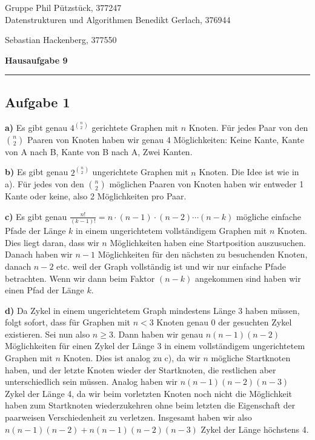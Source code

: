 \documentclass[a4paper,graphics,11pt]{article}
\newcommand{\aufgabe}[1]{\subsection*{Aufgabe #1}}
\begin{document}
\noindent Gruppe              \hfill Phil Pützstück, 377247\\
\noindent Datenstrukturen und Algorithmen \hfill Benedikt Gerlach, 376944\\
\strut\hfill Sebastian Hackenberg, 377550\\
\begin{center}
	\LARGE{\textbf{Hausaufgabe 9}}
\end{center}
\begin{center}
\rule[0.1ex]{\textwidth}{1pt}
\end{center}

\aufgabe{1}
\textbf{a)}
Es gibt genau $4^{\binom{n}{2}}$ gerichtete Graphen mit $n$ Knoten. Für jedes Paar von den $\binom{n}{2}$ Paaren
von Knoten haben wir genau 4 Möglichkeiten: Keine Kante, Kante von A nach B, Kante von B nach A, Zwei Kanten.

\textbf{b)}
Es gibt genau $2^{\binom{n}{2}}$ ungerichtete Graphen mit $n$ Knoten. Die Idee ist wie in a). Für jedes von
den $\binom{n}{2}$ möglichen Paaren von Knoten haben wir entweder 1 Kante oder keine, also 2 Möglichkeiten
pro Paar.

\textbf{c)}
Es gibt genau $\frac{n!}{(k-1)!} = n \cdot (n-1) \cdot (n-2) \cdots (n-k)$ mögliche einfache Pfade der Länge
$k$ in einem ungerichtetem vollständigem Graphen mit $n$ Knoten. Dies liegt daran, dass wir $n$ Möglichkeiten
haben eine Startposition auszusuchen. Danach haben wir $n-1$ Möglichkeiten für den nächsten zu besuchenden
Knoten, danach $n-2$ etc. weil der Graph vollständig ist und wir nur einfache Pfade betrachten. Wenn wir
dann beim Faktor $(n-k)$ angekommen sind haben wir einen Pfad der Länge $k$.

\textbf{d)}
Da Zykel in einem ungerichtetem Graph mindestens Länge 3 haben müssen, folgt sofort, dass für Graphen mit $n < 3$
Knoten genau 0 der gesuchten Zykel existieren. Sei nun also $n \geq 3$. Dann haben wir
genau $n(n-1)(n-2)$ Möglichkeiten für einen Zykel der Länge 3 in einem vollständigem ungerichtetem Graphen
mit $n$ Knoten. Dies ist analog zu c), da wir $n$ mögliche Startknoten haben, und der letzte Knoten wieder
der Startknoten, die restlichen aber unterschiedlich sein müssen. Analog haben wir $n(n-1)(n-2)(n-3)$
Zykel der Länge 4, da wir beim vorletzten Knoten noch nicht die Möglichkeit haben zum Startknoten wiederzukehren
ohne beim letzten die Eigenschaft der paarweisen Verschiedenheit zu verletzen.
Insgesamt haben wir also $n(n-1)(n-2)+n(n-1)(n-2)(n-3)$ Zykel der Länge höchstens 4.
\end{document}
